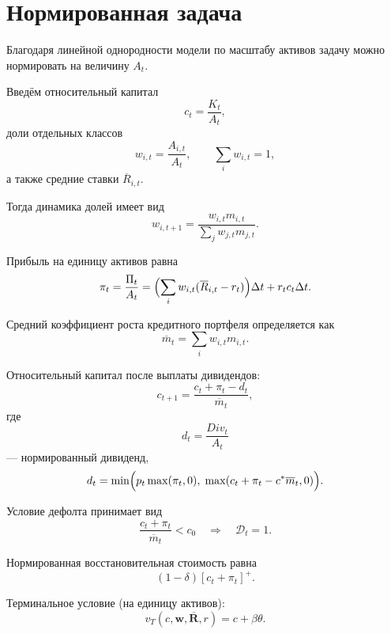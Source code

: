 \documentclass[11pt,a4paper]{article}
\newcommand{\1}{\mathbf{1}}
\newcommand{\pos}[1]{\left[#1\right]^+}
\begin{document}
\section{Нормированная задача}

Благодаря линейной однородности модели по масштабу активов задачу можно нормировать на величину $A_t$.

Введём относительный капитал
\[
c_t=\frac{K_t}{A_t},
\]
доли отдельных классов
\[
w_{i,t}=\frac{A_{i,t}}{A_t},
\qquad
\sum_i w_{i,t}=1,
\]
а также средние ставки $\overline{R}_{i,t}$.

Тогда динамика долей имеет вид
\begin{equation}
    w_{i,t+1}
    =
    \frac{w_{i,t}m_{i,t}}
    {\sum_j w_{j,t}m_{j,t}}.
\end{equation}

Прибыль на единицу активов равна
\begin{equation}
    \pi_t
    =
    \frac{\Pi_t}{A_t}
    =
    \Bigl(
    \sum_i
    w_{i,t}
    (\overline{R}_{i,t}-r_t)
    \Bigr)\Delta t
    +
    r_tc_t\Delta t.
\end{equation}

Средний коэффициент роста кредитного портфеля определяется как
\begin{equation}
    \overline{m}_t
    =
    \sum_i
    w_{i,t}m_{i,t}.
\end{equation}

Относительный капитал после выплаты дивидендов:
\begin{equation}
    c_{t+1}
    =
    \frac{c_t+\pi_t-d_t}
    {\overline{m}_t},
\end{equation}
где
\[
d_t=\frac{Div_t}{A_t}
\]
--- нормированный дивиденд,
\begin{equation}
    d_t=
    \min\Bigl(
    p_t\max(\pi_t,0),
    \;
    \max(c_t+\pi_t-c^*\overline{m}_t,0)
    \Bigr).
\end{equation}

Условие дефолта принимает вид
\begin{equation}
    \frac{c_t+\pi_t}{\overline{m}_t}<c_0
    \quad\Rightarrow\quad
    \mathcal{D}_t=1.
\end{equation}

Нормированная восстановительная стоимость равна
\[
(1-\delta)\pos{c_t+\pi_t}.
\]

Терминальное условие (на единицу активов):
\begin{equation}
    v_T(c,\mathbf{w},\overline{\mathbf{R}},r)
    =
    c+\beta\theta.
\end{equation}
\end{document}
